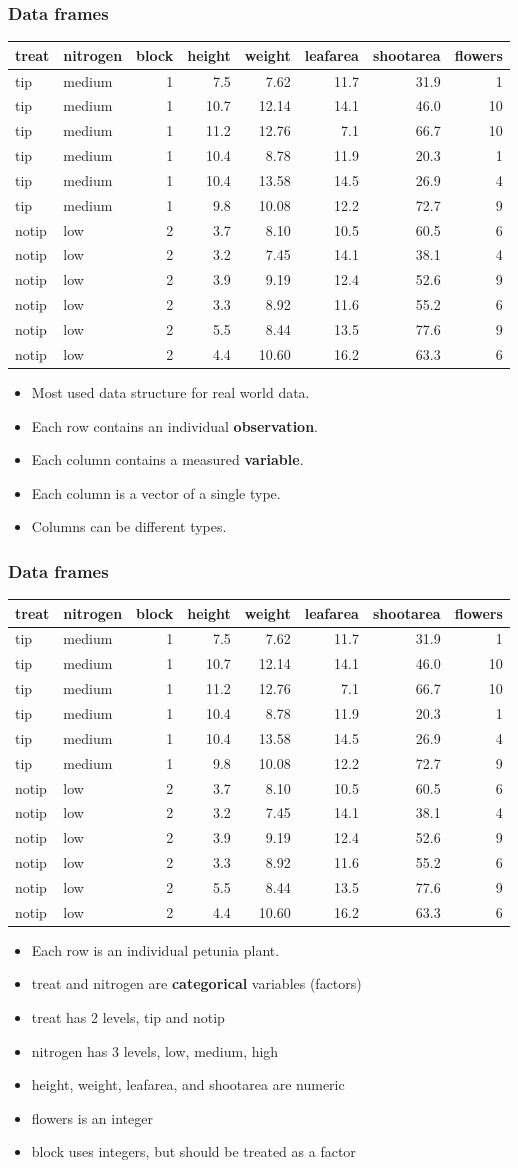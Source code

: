 \documentclass{beamer}
\newcommand{\bi}{\begin{itemize}}
\newcommand{\li}{\item}
\newcommand{\ei}{\end{itemize}}
\newcommand{\bfr}[1]{\begin{frame}[fragile]\frametitle{{ #1 }}}
\begin{document}
\bfr{Data frames}
{\scriptsize
\begin{tabular}{llrrrrrr}
treat&	nitrogen&	block&	height&	weight&	leafarea&	shootarea&	flowers\\\hline
tip&	medium&	1&	7.5&	7.62&	11.7&	31.9&	1\\
tip&	medium&	1&	10.7&	12.14&	14.1&	46.0&	10\\
tip&	medium&	1&	11.2&	12.76&	7.1&	66.7&	10\\
tip&	medium&	1&	10.4&	8.78&	11.9&	20.3&	1\\
tip&	medium&	1&	10.4&	13.58&	14.5&	26.9&	4\\
tip&	medium&	1&	9.8&	10.08&	12.2&	72.7&	9\\
notip&	low&	2&	3.7&	8.10&	10.5&	60.5&	6\\
notip&	low&	2&	3.2&	7.45&	14.1&	38.1&	4\\
notip&	low&	2&	3.9&	9.19&	12.4&	52.6&	9\\
notip&	low&	2&	3.3&	8.92&	11.6&	55.2&	6\\
notip&	low&	2&	5.5&	8.44&	13.5&	77.6&	9\\
notip&	low&	2&	4.4&	10.60&	16.2&	63.3&	6\\
\end{tabular}
}
\bi
\li Most used data structure for real world data.
\li Each row contains an individual {\bf observation}.
\li Each column contains a measured {\bf variable}.
\li Each column is a vector of a single type.
\li Columns can be different types.
\ei
\end{frame}


\bfr{Data frames}
{\scriptsize
\begin{tabular}{llrrrrrr}
treat&	nitrogen&	block&	height&	weight&	leafarea&	shootarea&	flowers\\\hline
tip&	medium&	1&	7.5&	7.62&	11.7&	31.9&	1\\
tip&	medium&	1&	10.7&	12.14&	14.1&	46.0&	10\\
tip&	medium&	1&	11.2&	12.76&	7.1&	66.7&	10\\
tip&	medium&	1&	10.4&	8.78&	11.9&	20.3&	1\\
tip&	medium&	1&	10.4&	13.58&	14.5&	26.9&	4\\
tip&	medium&	1&	9.8&	10.08&	12.2&	72.7&	9\\
notip&	low&	2&	3.7&	8.10&	10.5&	60.5&	6\\
notip&	low&	2&	3.2&	7.45&	14.1&	38.1&	4\\
notip&	low&	2&	3.9&	9.19&	12.4&	52.6&	9\\
notip&	low&	2&	3.3&	8.92&	11.6&	55.2&	6\\
notip&	low&	2&	5.5&	8.44&	13.5&	77.6&	9\\
notip&	low&	2&	4.4&	10.60&	16.2&	63.3&	6\\
\end{tabular}
}
\bi
\li Each row is an individual petunia plant.
\li treat and nitrogen are {\bf categorical} variables (factors)
\li treat has 2 levels, tip and notip
\li nitrogen has 3 levels, low, medium, high
\li height, weight, leafarea, and shootarea are numeric
\li flowers is an integer
\li block uses integers, but should be treated as a factor
\ei
\end{frame}
\end{document}
